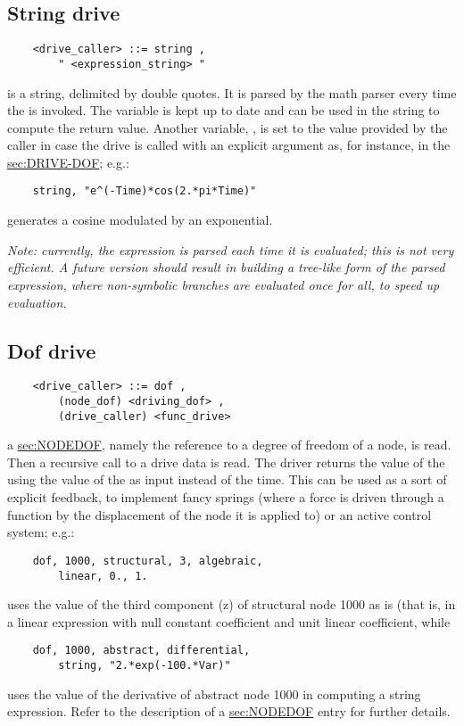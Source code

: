\subsection{String drive}
\begin{verbatim}
    <drive_caller> ::= string ,
        " <expression_string> "
\end{verbatim}
 is a string, delimited by double quotes.
It is parsed by the math parser every time 
the  is invoked.
The variable  is kept up to date and can be used in the 
string to compute the return value.
Another variable, , is set to the value provided by the caller
in case the drive is called with an explicit argument as, for instance,
in the \hyperref{dof drive}{dof drive (see Section~}{)}{sec:DRIVE-DOF};
e.g.:
\begin{verbatim}
    string, "e^(-Time)*cos(2.*pi*Time)"
\end{verbatim}
generates a cosine modulated by an exponential.

\noindent
\emph{Note: currently, the expression is parsed each time it is evaluated;
this is not very efficient.
A future version should result in building a tree-like form of the
parsed expression, where non-symbolic branches are evaluated once for all,
to speed up evaluation.}


\subsection{Dof drive}\label{sec:DRIVE-DOF}
\begin{verbatim}
    <drive_caller> ::= dof ,
        (node_dof) <driving_dof> ,
        (drive_caller) <func_drive>
\end{verbatim}
a \hyperref{\kw{node\_dof}}{\kw{node\_dof} (see Section~}{)}{sec:NODEDOF}, 
namely the reference to a degree of freedom of a node, is read. 
Then a recursive call to a drive data is read. 
The driver returns the value of the  
 using the value of the 
 as input instead of the time. 
This can be used as a sort of explicit feedback, to implement fancy
springs (where a force is driven through a function by the displacement
of the node it is applied to) or an active control system; e.g.:
\begin{verbatim}
    dof, 1000, structural, 3, algebraic, 
        linear, 0., 1.
\end{verbatim}
uses the value of the third component (z) of structural node 1000 
as is (that is, in a linear expression with null constant coefficient 
and unit linear coefficient, while
\begin{verbatim}
    dof, 1000, abstract, differential, 
        string, "2.*exp(-100.*Var)"
\end{verbatim}
uses the value of the derivative of abstract node 1000 in computing 
a string expression.
Refer to the description of a 
\hyperref{\kw{node\_dof}}{\kw{node\_dof} (see Section~}{)}{sec:NODEDOF}
entry for further details.

